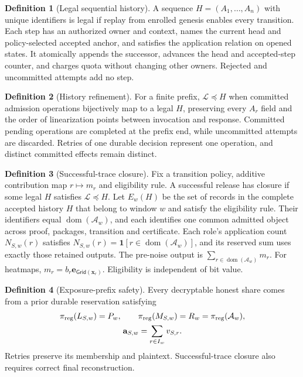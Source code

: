 \documentclass[conference,compsoc]{IEEEtran}
\theoremstyle{definition}
\newtheorem{definition}{Definition}[section]
\newtheorem{definition}{Definition}
\numberwithin{equation}{section}
\numberwithin{table}{section}
\numberwithin{figure}{section}
\theoremstyle{plain}
\begin{document}
\begin{definition}[Legal sequential history]
\label{def:legal-history}
A sequence \(H=(A_1,\ldots,A_n)\) with unique identifiers is legal if replay
from enrolled genesis enables every transition. Each step has an authorized
owner and context, names the current head and policy-selected accepted anchor,
and satisfies the application relation on opened states. It atomically appends
the successor, advances the head and accepted-step counter, and charges quota
without changing other owners. Rejected and uncommitted attempts add no step.
\end{definition}

\begin{definition}[History refinement]
\label{def:history-refinement}
For a finite prefix, \(\mathcal L\preceq H\) when committed admission
operations bijectively map to a legal \(H\), preserving every \(A_r\) field
and the order of linearization points between invocation and response.
Committed pending operations are completed at the prefix end, while
uncommitted attempts are discarded. Retries of one durable decision represent
one operation, and distinct committed effects remain distinct.
\end{definition}

\begin{definition}[Successful-trace closure]
\label{def:trace-closure}
Fix a transition policy, additive contribution map \(r\mapsto m_r\) and
eligibility rule. A successful release has closure if some legal \(H\)
satisfies \(\mathcal L\preceq H\). Let \(E_w(H)\) be the set of records in
the complete accepted history \(H\) that belong to window \(w\) and satisfy
the eligibility rule. Their identifiers equal \(\operatorname{dom}(\mathcal A_w)\),
and each identifies one common admitted object across proof, packages,
transition and certificate. Each role's application count \(N_{S,w}(r)\) satisfies
\(N_{S,w}(r)=\mathbf1[r\in\operatorname{dom}(\mathcal A_w)]\), and its reserved sum uses exactly
those retained outputs. The pre-noise output is
\(\sum_{r\in\operatorname{dom}(\mathcal A_w)}m_r\). For heatmaps,
\(m_r=b_r\mathbf e_{\mathsf{Grid}(\mathbf x_r)}\). Eligibility is independent
of bit value.
\end{definition}

\begin{definition}[Exposure-prefix safety]
\label{def:exposure-prefix}
Every decryptable honest share comes from a prior durable reservation
satisfying
\begin{equation}
 \begin{gathered}
 \pi_{\rm reg}(L_{S,w})=P_w,\qquad
 \pi_{\rm reg}(M_{S,w})=R_w=\pi_{\rm reg}(\mathcal A_w),\\
 \mathbf a_{S,w}=\sum_{r\in I_w}v_{S,r}.
 \end{gathered}
 \label{eq:export-safety}
\end{equation}
Retries preserve its membership and plaintext. Successful-trace closure also
requires correct final reconstruction.
\end{definition}
\end{document}
